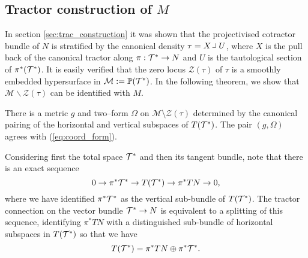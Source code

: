 \subsection{Tractor construction of $M$}

In section \ref{sec:trac_construction} it was shown that the projectivised cotractor bundle of $N$ is stratified by the canonical density $\tau=X\hook U$, where $X$ is the pull back of the canonical tractor along $\pi:\mathcal{T}^*\rightarrow N$ and $U$ is the tautological section of $\pi^*(\mathcal{T}^*)$. It is easily verified that the zero locus $\mathcal{Z}(\tau)$ of $\tau$ is a smoothly embedded hypersurface in $\mathcal{M}:=\mathbb{P}(\mathcal{T}^*)$. %
In the following theorem, we show that $\mathcal{M}\backslash\mathcal{Z}(\tau)$ can be identified with $M$.

\begin{theo}\cite{DGW}\label{metric} 
There is a metric $g$ and two--form $\Omega$ on $\mathcal{M}\setminus \mathcal{Z}(\tau)$ determined by the canonical pairing of the horizontal and vertical subspaces of $T(\mathcal{T}^*)$. The pair $(g,\Omega)$ agrees with (\ref{eq:coord_form}).
\end{theo}
 Considering first the total space $\mathcal{T}^*$ and then its tangent
 bundle, note that there is an exact sequence
  \begin{equation}\label{TM}
0\to \pi^* \mathcal{T}^*\to T(\mathcal{T}^*)\to \pi^*TN\to 0,
  \end{equation}
  where we have identified $\pi^* \mathcal{T}^*$ as the vertical sub-bundle of $T(\mathcal{T}^*)$.
The tractor connection on the vector bundle $\mathcal{T}^*\to N$ is equivalent to a splitting of this sequence, identifying $\pi^*TN$ with a distinguished  sub-bundle of horizontal subspaces in 
$ T(\mathcal{T}^*)$ so that we have 
\begin{equation}\label{HV}
T(\mathcal{T}^*)=  \pi^*TN\oplus \pi^* \mathcal{T}^* .
\end{equation}

